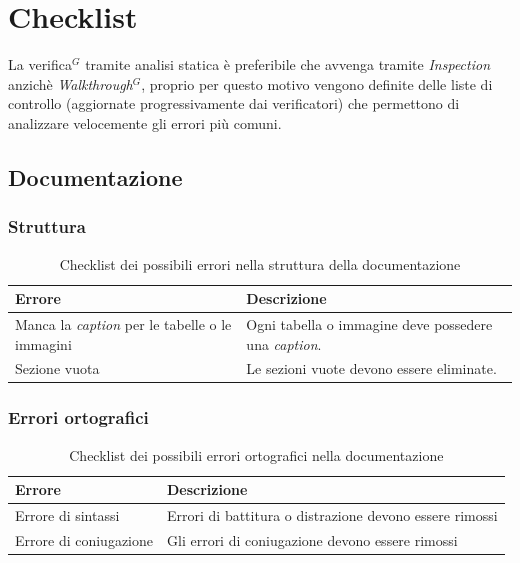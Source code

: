 \documentclass[a4paper,10pt]{article}
\begin{document}
\section{Checklist}
La verifica$^G$ tramite analisi statica è preferibile che avvenga tramite \textit{Inspection} anzichè \textit{Walkthrough$^G$}, proprio per questo motivo vengono definite delle liste di controllo (aggiornate progressivamente dai verificatori) che permettono di analizzare velocemente gli errori più comuni.
\subsection{Documentazione}
\subsubsection{Struttura}
\begin{table}[H]
\centering
\renewcommand{\arraystretch}{1.2}
\begin{tabular}{|p{4cm}|p{9cm}|}
\hline
\textbf{Errore} & \textbf{Descrizione} \\
\hline
Manca la \textit{caption} per le tabelle o le immagini &
Ogni tabella o immagine deve possedere una \textit{caption}. \\
\hline
Sezione vuota &
Le sezioni vuote devono essere eliminate. \\
\hline
\end{tabular}
\caption{Checklist dei possibili errori nella struttura della documentazione}
\label{tab:checklist-struttura}
\end{table}
\subsubsection{Errori ortografici}
\begin{table}[H]
\centering
\renewcommand{\arraystretch}{1.2}
\begin{tabular}{|p{4cm}|p{9cm}|}
\hline
\textbf{Errore} & \textbf{Descrizione} \\
\hline
Errore di sintassi & Errori di battitura o distrazione devono essere rimossi \\
\hline
Errore di coniugazione & Gli errori di coniugazione devono essere rimossi \\
\hline
\end{tabular}
\caption{Checklist dei possibili errori ortografici nella documentazione}
\label{tab:checklist-ortografia}
\end{table}
\end{document}
